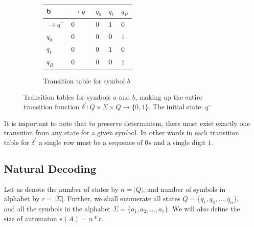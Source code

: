 \documentclass{mini}
\begin{document}
\begin{figure}[H]
\begin{center}
\begin{subfigure}{.5\textwidth}
\begin{tabular}{|P{1.0cm} || P{0.8cm} | P{0.8cm} | P{0.8cm} | P{0.8cm}|}
                \hline
                b & $\rightarrow$$q^-$ & $q_0$ & $q_1$ & $q_R$ \\
                \hline
                \hline
                $\rightarrow$$q^-$ 		& $0$ & $0$ & $1$ & $0$ \\
                \hline
                $q_0$ 		& $0$ & $0$ & $0$ & $1$ \\
                \hline
                $q_1$ 		& $0$ & $0$ & $1$ & $0$ \\
                \hline
                $q_R$  					& $0$ & $0$ & $0$ & $1$ \\
                \hline
                
            \end{tabular}
            
            \caption{Transition table for symbol $b$}
            \label{fig:ttable_bin_b}
            
        \end{subfigure}%
        
        
        \caption{Transition tables for symbols $a$ and $b$, making up the entire transition function $\delta^{'}: Q \times \Sigma \times Q \rightarrow \{0,1\}$. The initial state: $q^-$}
        
        \label{fig:ttable_bin}
    \end{center}
\end{figure}

It is important to note that to preserve determinism, there must exist exactly one transition from any state for a given symbol. In other words in each transition table for $\delta^{'}$ a single row must be a sequence of $0s$ and a single digit $1$.

\subsection{Natural Decoding} \label{sec:auto_dec}

Let us denote the number of states by $n = |Q|$, and number of symbols in alphabet by $r = |\Sigma|$. Further, we shall enumerate all states 	$Q = \{q_1, q_2, \ldots, q_n\}$, and all the symbols in the alphabet 	$\Sigma = \{a_1, a_2, \ldots, a_r\}$. We will also define the size of automaton $s(A) = n*r$.
\end{document}
